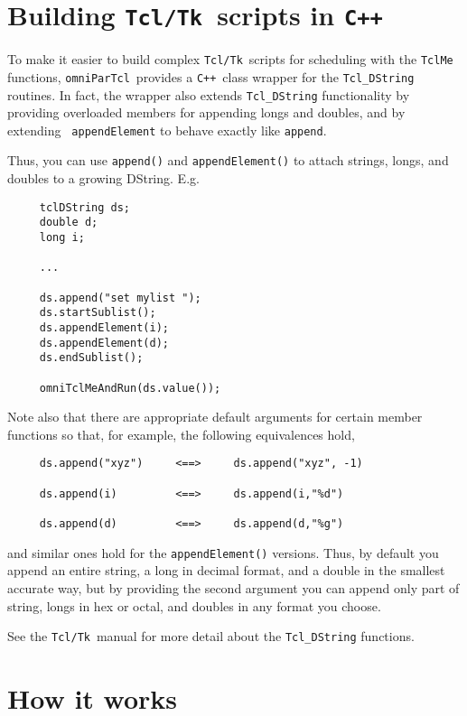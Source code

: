 \documentclass[11pt,twoside,onecolumn]{article}
\def\omniParTcl{{\tt omniParTcl}}
\def\tcltk{{\tt Tcl/Tk}}
\def\CXX{{\tt C++}}
\begin{document}
\section{Building \tcltk\ scripts in \CXX}

To make it easier to build complex \tcltk\ scripts for scheduling
with the {\tt TclMe} functions, \omniParTcl\ provides a \CXX\ class
wrapper for the {\tt Tcl\_DString} routines.  In fact, the wrapper also
extends {\tt Tcl\_DString} functionality by providing overloaded
members for appending longs and doubles, and by extending {\tt
appendElement} to behave exactly like {\tt append}.

Thus, 
you can use {\tt append()} and {\tt appendElement()} to
attach strings, longs, and doubles to a growing DString.  E.g.

\begin{verbatim}
     tclDString ds;
     double d;
     long i;

     ...

     ds.append("set mylist ");
     ds.startSublist();
     ds.appendElement(i);
     ds.appendElement(d);
     ds.endSublist();

     omniTclMeAndRun(ds.value());
\end{verbatim}

Note also that there are appropriate default arguments for certain
member functions so that, for example, the following equivalences
hold,

\begin{verbatim}
     ds.append("xyz")     <==>     ds.append("xyz", -1)

     ds.append(i)         <==>     ds.append(i,"%d")  

     ds.append(d)         <==>     ds.append(d,"%g")
\end{verbatim}

\noindent
and similar ones hold for the {\tt appendElement()} versions.  Thus, by
default you append an entire string, a long in decimal format, and a
double in the smallest accurate way, but by providing the second
argument you can append only part of string, longs in hex or octal, and
doubles in any format you choose.

See the \tcltk\ manual for more detail about the {\tt Tcl\_DString} functions.

\section{How it works}
\end{document}
